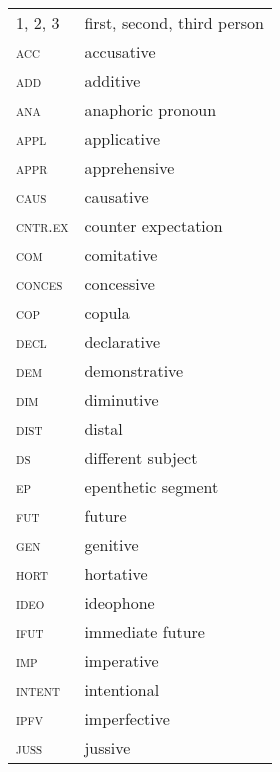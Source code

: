 \documentclass[output=paper]{langscibook}
\begin{document}
\noindent
\begin{tabularx}{.45\textwidth}[t]{lQ}
\textsc{1,} \textsc{2,} \textsc{3}  &  first, second, third person\\
\textsc{acc}  &  accusative\\
\textsc{add}  &  additive\\
\textsc{ana}  &  anaphoric pronoun\\
\textsc{appl}  &  applicative\\
\textsc{appr}  &  apprehensive\\
\textsc{caus}  &  causative\\
\textsc{cntr.ex}  &  counter expectation\\
\textsc{com}  &  comitative\\
\textsc{conces}  &  concessive\\
\textsc{cop}  &  copula\\
\textsc{decl}  &  declarative\\
\textsc{dem}  &  demonstrative\\
\textsc{dim}  &  diminutive\\
\textsc{dist}  &  distal\\
\textsc{ds}  &  different subject\\
\textsc{ep}  &  epenthetic segment\\
\textsc{fut}  &  future\\
\textsc{gen}  &  genitive\\
\textsc{hort}  &  hortative\\
\textsc{ideo}  &  ideophone\\
\textsc{ifut}  &  immediate future\\
\textsc{imp}  &  imperative\\
\textsc{intent}  &  intentional\\
\textsc{ipfv}  &  imperfective\\
\textsc{juss}  &  jussive\\
\end{tabularx}
\end{document}
